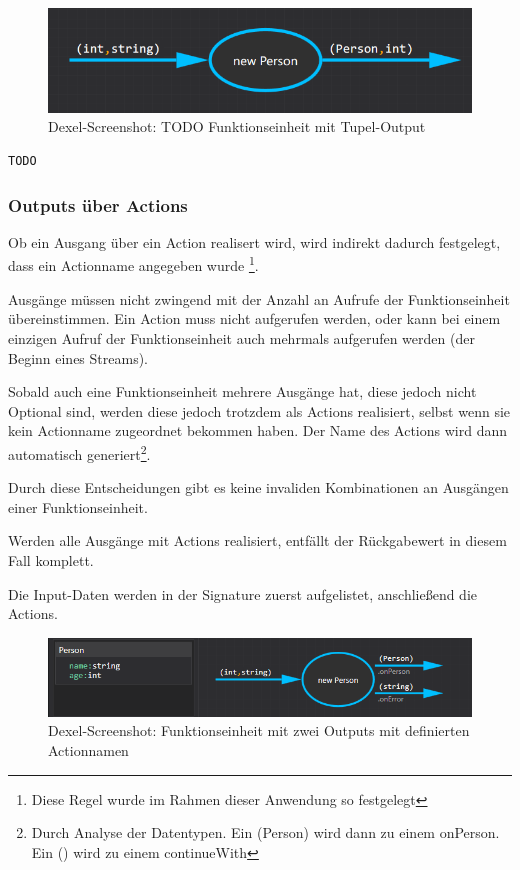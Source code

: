 		\begin{figure}[H]
			\centering
			\includegraphics[width=.8\linewidth]{./img/roslyn_twoDatatypesOneOutput.png} 
			\caption{Dexel-Screenshot:  TODO Funktionseinheit mit Tupel-Output}
		\end{figure}

	
	
	\begin{lstlisting}[caption=Mit Dexel generierter Code ]
	TODO
	\end{lstlisting}

	
\subsubsection{Outputs über Actions}

	Ob ein Ausgang über ein Action realisert wird, wird indirekt dadurch
	festgelegt, dass ein Actionname angegeben wurde \footnote{Diese Regel wurde im
		Rahmen dieser Anwendung so festgelegt}. 
	
	Ausgänge müssen nicht zwingend mit
	der Anzahl an Aufrufe der Funktionseinheit übereinstimmen. Ein Action muss
	nicht aufgerufen werden, oder kann bei einem einzigen Aufruf der Funktionseinheit auch
	mehrmals aufgerufen werden (der Beginn eines Streams). 
	
	Sobald auch eine Funktionseinheit mehrere Ausgänge hat, diese jedoch nicht
	Optional sind, werden diese jedoch trotzdem als Actions realisiert, selbst wenn sie kein
	Actionname zugeordnet bekommen haben. Der Name des Actions wird dann
	automatisch generiert\footnote{	Durch Analyse der Datentypen. Ein
	(Person) wird dann zu einem onPerson. Ein () wird zu einem continueWith}.
	
	Durch diese Entscheidungen gibt es keine invaliden Kombinationen an
	Ausgängen einer Funktionseinheit.
	
	
	Werden alle Ausgänge mit Actions realisiert, entfällt der Rückgabewert in diesem Fall komplett.
	
	Die Input-Daten werden in der Signature zuerst aufgelistet, anschließend die Actions.
	
			\begin{figure}[H]
				\centering
				\includegraphics[width=\linewidth]{./img/roslyn_multipleOutputs.png} 
				\caption{Dexel-Screenshot: Funktionseinheit mit zwei Outputs mit definierten Actionnamen}
			\end{figure}
			

